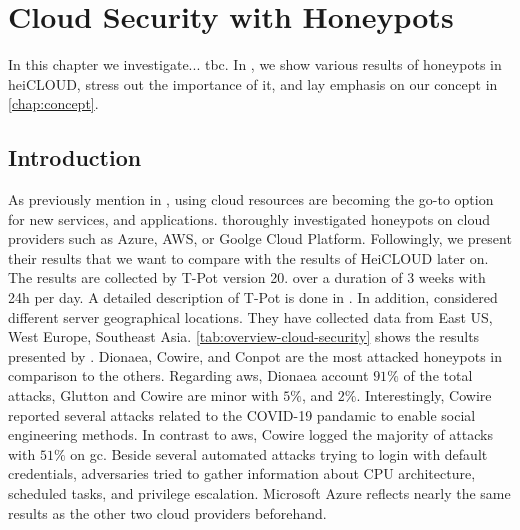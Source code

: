 \chapter{Cloud Security with Honeypots}

In this chapter we investigate... tbc.
In , we show various results of honeypots in heiCLOUD, stress out the importance of it, and lay emphasis on our concept in \autoref{chap:concept}.

\section{Introduction}

As previously mention in , using cloud resources are becoming the go-to option for new services, and applications.
\citet{Kelly2021} thoroughly investigated honeypots on cloud providers such as Azure, AWS, or Goolge Cloud Platform.
Followingly, we present their results that we want to compare with the results of HeiCLOUD later on.
The results are collected by T-Pot version 20. over a duration of 3 weeks with 24h per day.
A detailed description of T-Pot is done in .
In addition, \citet{Kelly2021} considered different server geographical locations.
They have collected data from East US, West Europe, Southeast Asia.
\autoref{tab:overview-cloud-security} shows the results presented by \citet{Kelly2021}.
Dionaea, Cowire, and Conpot are the most attacked honeypots in comparison to the others.
Regarding \ac{aws}, Dionaea account $91\%$ of the total attacks, Glutton and Cowire are minor with $5\%$, and $2\%$.
Interestingly, Cowire reported several attacks related to the COVID-19 pandamic to enable social engineering methods.
In contrast to \ac{aws}, Cowire logged the majority of attacks with $51\%$ on \ac{gc}.
Beside several automated attacks trying to login with default credentials, adversaries tried to gather information about CPU architecture, scheduled tasks, and privilege escalation.
Microsoft Azure reflects nearly the same results as the other two cloud providers beforehand.

